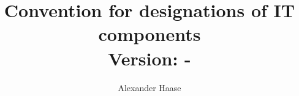 \documentclass[a4paper,11pt]{article}
\title{
	Convention for designations of IT components \\
	\small Version: \gitVtag-\gitAbbrevHash
}
\author{Alexander Haase}
\date{\gitAuthorDate}
\begin{document}
	\maketitle


	

	
	
	
	
	


	\nocite{*}
	{}
	
\end{document}
